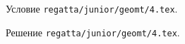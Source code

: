 Условие \texttt{regatta/junior/geomt/4.tex}.

\solution Решение \texttt{regatta/junior/geomt/4.tex}.
